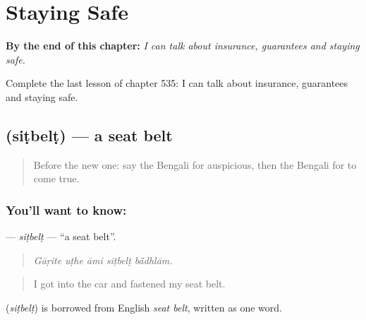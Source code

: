 
\chapter{Staying Safe}
\label{ch:bn-staying-safe}

\begin{chapteropening}
\textbf{By the end of this chapter:} \emph{I can talk about insurance, guarantees and staying safe.}

Complete the last lesson of chapter 535: I can talk about insurance, guarantees and staying safe.
\end{chapteropening}

\section[\texorpdfstring{\bn{সিটবেল্ট} (siṭbelṭ)}{সিটবেল্ট (siṭbelṭ)}]{ (siṭbelṭ) — a seat belt}

\label{lesson:BN-C535-sitbelt}



\begin{quote}
Before the new one: say the Bengali for auspicious, then the Bengali for to come true.
\end{quote}

\subsection*{You'll want to know: }
\textbf{} — \emph{siṭbelṭ} — \textquotedblleft{}a seat belt\textquotedblright{}.

\begin{quote}
    
\end{quote}

\begin{quote}
\emph{Gāṛite uṭhe āmi siṭbelṭ bā̃dhlām.}
\end{quote}

\begin{quote}
I got into the car and fastened my seat belt.
\end{quote}

\begin{cousinweb}
\textbf{} (\emph{siṭbelṭ}) is borrowed from English \emph{seat belt}, written as one word.
\end{cousinweb}

